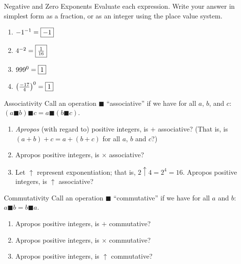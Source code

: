 \documentclass[12pt,letterpaper]{article}
\begin{document}
\begin{problem}{Negative and Zero Exponents}
 Evaluate each expression. Write your answer in simplest form as a fraction, or
 as an integer using the place value system.

 \begin{enumerate}[\hspace{.5cm}a.]
  \item ${-1}^{-1}=\framebox{$-1$}$
  \item $4^{-2}=\framebox{$\frac{1}{16}$}$
  \item ${999}^0=\framebox{$1$}$
  \item ${\left(\frac{-17}{4}\right)}^0=\framebox{$1$}$
 \end{enumerate}
\end{problem}

\begin{problem}{Associativity}
 Call an operation $\blacksquare$ ``associative'' if we have for all $a$, $b$,
 and $c$: $(a \blacksquare b) \blacksquare c = a \blacksquare (b \blacksquare
 c)$.

 \begin{enumerate}[\hspace{.5cm}a.]
  \item \emph{Apropos} (with regard to) positive integers, is $+$ associative?
  (That is, is $(a+b)+c=a+(b+c)$ for all $a$, $b$ and $c$?) 
  \item Apropos positive integers, is $\times$ associative? 
  \item Let $\uparrow$ represent exponentiation; that is, $2\uparrow4=2^4=16$.
  Apropos positive integers, is $\uparrow$ associative? 
 \end{enumerate}
\end{problem}

\begin{problem}{Commutativity}
 Call an operation $\blacksquare$ ``commutative'' if we have for all $a$ and
 $b$: $a \blacksquare b = b \blacksquare a$.

 \begin{enumerate}[\hspace{.5cm}a.]
  \item Apropos positive integers, is $+$ commutative? 
  \item Apropos positive integers, is $\times$ commutative? 
  \item Apropos positive integers, is $\uparrow$ commutative? 
 \end{enumerate}
\end{problem}
\end{document}
